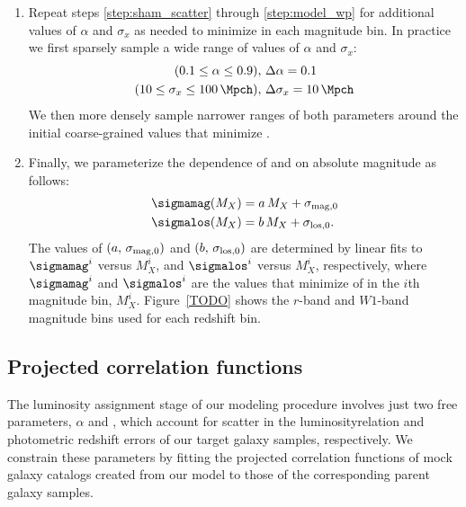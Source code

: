 \documentclass[twocolumn,apj,iop,tighten]{emulateapj2}
\begin{document}
\begin{enumerate}[leftmargin=0pt, itemindent=24pt, listparindent=10pt, label=(\arabic*), nosep]
%
\item \label{step:model_refine}
Repeat steps \ref{step:sham_scatter} through \ref{step:model_wp} for additional values of $\alpha$ and $\sigma_x$ as needed to minimize \chisqred in each magnitude bin. In practice we first sparsely sample a wide range of values of $\alpha$ and $\sigma_x$:
%
\begin{subequations}
  \begin{align}
    (0.1 \leq \alpha \leq 0.9),\ &\Delta\alpha=0.1 \\
    (10 \leq \sigma_x \leq 100\, \Mpch),\ &\Delta\sigma_x=10\, \Mpch
  \end{align}
\end{subequations}
%
\noindent We then more densely sample narrower ranges of both parameters around the initial coarse-grained values that minimize \chisqred.
%
\item \label{step:sigma_linear}
Finally, we parameterize the dependence of \sigmamag and \sigmalos on absolute magnitude as follows:
%
\begin{subequations}\label{eq:sigma_linear}
\begin{align}
  \sigmamag(M_X) &= a\, M_X + \sigma_{{\rm mag},0} \\
  \sigmalos(M_X) &= b\, M_X + \sigma_{{\rm los},0}.
\end{align}
\end{subequations}
%
\noindent The values of $(a,\, \sigma_{{\rm mag},0})$ and $(b,\, \sigma_{{\rm los},0})$ are determined by linear fits to $\sigmamag^i$ versus $M^i_X$, and $\sigmalos^i$ versus $M^i_X$, respectively, where $\sigmamag^i$ and $\sigmalos^i$ are the values that minimize \chisqred of \wprp in the $i$th magnitude bin, $M^i_X$. Figure~\ref{TODO} shows the $r$-band and $W1$-band magnitude bins used for each redshift bin.
\end{enumerate}

\subsection{Projected correlation functions}\label{subsec:wprp}

The luminosity assignment stage of our modeling procedure involves just two free parameters, $\alpha$ and \sigmalos, which account for scatter in the luminosity\textendash\vcirc relation and photometric redshift errors of our target galaxy samples, respectively. We constrain these parameters by fitting the projected correlation functions of mock galaxy catalogs created from our model to those of the corresponding parent galaxy samples.
\end{document}
